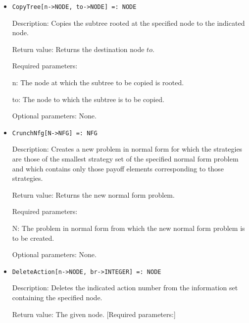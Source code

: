\begin{itemize}
\item

\protect \large \begin{verbatim}
CopyTree[n->NODE, to->NODE] =: NODE
\end{verbatim}\normalsize

\bd
\item
[Description:] Copies the subtree rooted at the specified node to the
indicated node.
\item
[Return value:] Returns the destination node $to$.
\item
[Required parameters:]\hfil\null

\bd
\item	
[n:] The node at which the subtree to be copied is rooted.
\item
[to:] The node to which the subtree is to be copied.
\ed

\item
[Optional parameters:] None.
\ed

\item
\protect \large \begin{verbatim}
CrunchNfg[N->NFG] =: NFG
\end{verbatim}\normalsize

\bd
\item
[Description:] Creates a new problem in normal form for which the
strategies are those of the smallest strategy set of the specified
normal form problem and which contains only those payoff elements
corresponding to those strategies.
\item
[Return value:] Returns the new normal form problem.
\item
[Required parameters:]\hfil\null
	
\bd
\item
[N:] The problem in normal form from which the new normal form problem
is to be created.
\ed

\item  
[Optional parameters:] None.
\ed


\item
\protect \large \begin{verbatim}
DeleteAction[n->NODE, br->INTEGER] =: NODE
\end{verbatim}\normalsize

\bd
\item
[Description:] Deletes the indicated action number from the
information set containing the specified node.
\item
[Return value:] The given node.  [Required parameters:]\hfil\null
	

\end{itemize}
